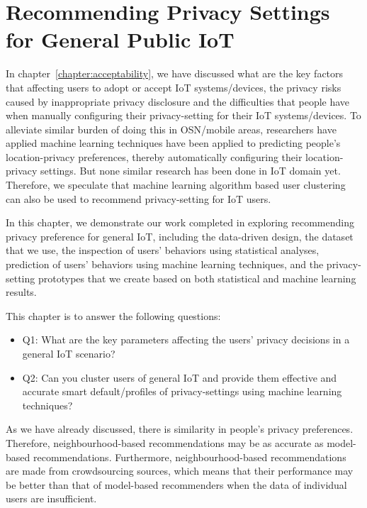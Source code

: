 \chapter{Recommending Privacy Settings for General Public IoT}\label{chapter:generalIoT}

In chapter~\ref{chapter:acceptability}, we have discussed what are the key factors that affecting users to adopt or accept IoT systems/devices, the privacy risks caused by inappropriate privacy disclosure and the difficulties that people have when manually configuring their privacy-setting for their IoT systems/devices. To alleviate similar burden of doing this in OSN/mobile areas, researchers have applied machine learning techniques have been applied to predicting people’s location-privacy preferences, thereby automatically configuring their location-privacy settings. But none similar research has been done in IoT domain yet. Therefore, we speculate that machine learning algorithm based user clustering can also be used to recommend privacy-setting for IoT users.

In this chapter, we demonstrate our work completed in exploring recommending privacy preference for general IoT, including the data-driven design, the dataset that we use, the inspection of users' behaviors using statistical analyses, prediction of users' behaviors using machine learning techniques, and the privacy-setting prototypes that we create based on both statistical and machine learning results.

This chapter is to answer the following questions:
\begin{itemize}
	\item Q1: What are the key parameters affecting the users' privacy decisions in a general IoT scenario?
	\item Q2: Can you cluster users of general IoT and provide them effective and accurate smart default/profiles of privacy-settings using machine learning techniques?
\end{itemize}

As we have already discussed, there is similarity in people’s privacy preferences. Therefore,
neighbourhood-based recommendations may be as accurate as model-based recommendations.
Furthermore, neighbourhood-based recommendations are made from crowdsourcing sources,
which means that their performance may be better than that of model-based recommenders when
the data of individual users are insufficient.

